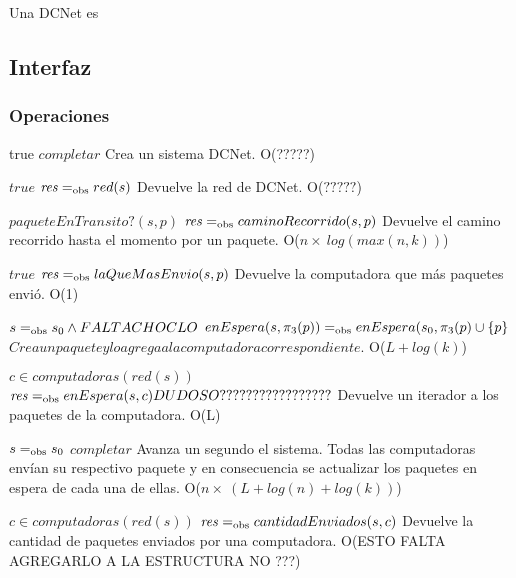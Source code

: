 

Una DCNet es

\subsection{Interfaz}



\subsubsection*{Operaciones}


 {true}
 {$completar$}
 {Crea un sistema DCNet.}
 {O(?????)}

 {$true$}
 {$\text{\textit{res}} =_{\mathrm{obs}} red(s)$}
 {Devuelve la red de DCNet.}
 {O($?????$)}

 {$paqueteEnTransito?(s,p)$}
 {$\text{\textit{res}} =_{\mathrm{obs}} caminoRecorrido(s,p)$}
 {Devuelve el camino recorrido hasta el momento por un paquete.}
 {O($n \times\  log(max(n,k))$)}

 {$true$}
 {$\text{\textit{res}} =_{\mathrm{obs}} laQueMasEnvio(s,p)$}
 {Devuelve la computadora que más paquetes envió.}
 {O(1)}

 {$s =_{\mathrm{obs}} s_0 \land FALTA CHOCLO$}
 {$enEspera(s,\pi_3(p)) =_{\mathrm{obs}} enEspera(s_0,\pi_3(p) \cup \{p\}$}
 {$Crea un paquete y lo agrega a la computadora correspondiente.$}
 {O($L + log(k)$)}

 {$c \in computadoras(red(s))$}
 {$\text{\textit{res}} =_{\mathrm{obs}} enEspera(s,c) DUDOSO?????????????????$}
 {Devuelve un iterador a los paquetes de la computadora.}
 {O(L)}

 {$s =_{\mathrm{obs}} s_0$}
 {$completar$}
 {Avanza un segundo el sistema. Todas las computadoras envían su respectivo paquete y en consecuencia se actualizar los paquetes en espera de cada una de ellas.}
 {O($n \times\ (L + log(n) + log(k))$)}

 {$c \in computadoras(red(s))$}
 {$\text{\textit{res}} =_{\mathrm{obs}} cantidadEnviados(s,c)$}
 {Devuelve la cantidad de paquetes enviados por una computadora.}
 {O(ESTO FALTA AGREGARLO A LA ESTRUCTURA NO ???)}

